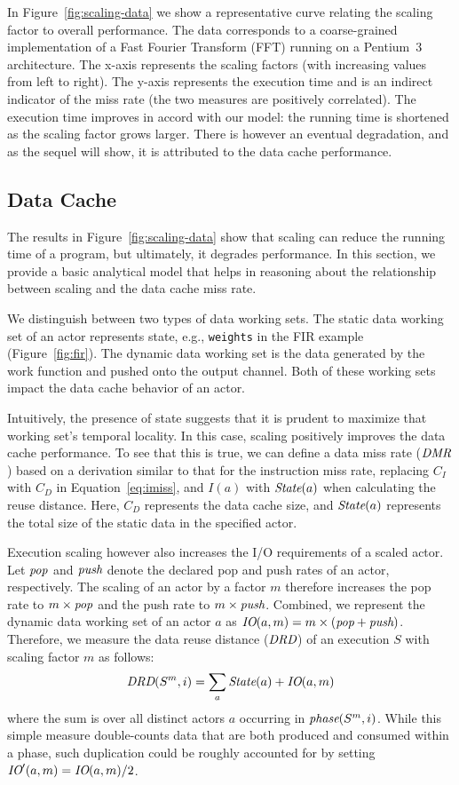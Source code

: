 \documentclass{sigplanconf}
\newcommand{\mt}[1]{\mbox{\it #1}}
\begin{document}
In Figure~\ref{fig:scaling-data} we show a
representative curve relating the scaling factor to overall
performance. The data corresponds to a coarse-grained implementation of 
a Fast Fourier Transform (FFT) running on a Pentium~3 architecture. The
x-axis represents the scaling factors (with increasing values from
left to right). The y-axis represents the execution time and is an
indirect indicator of the miss rate (the two measures are positively
correlated). The execution time improves in accord with our model: 
the running time is shortened as the scaling factor grows larger. There
is however an eventual degradation, and as the sequel will show, it is 
attributed to the data cache performance.

\subsection{Data Cache}

The results in Figure~\ref{fig:scaling-data} show that scaling can
reduce the running time of a program, but ultimately, it degrades
performance. In this section, we provide a basic analytical model that
helps in reasoning about the relationship between scaling and the data
cache miss rate. 

We distinguish between two types of data working sets. The static data
working set of an actor represents state, e.g., \texttt{weights} in
the FIR example (Figure~\ref{fig:fir}).  The dynamic data
working set is the data generated by the work function and pushed onto
the output channel. Both of these working sets impact the data cache
behavior of an actor.

Intuitively, the presence of state suggests that it is
prudent to maximize that working set's temporal locality. In this
case, scaling positively improves the data cache performance. To see
that this is true, we can define a data miss rate ($\mt{DMR}$) based on
a derivation similar to that for the instruction miss rate, replacing
$C_I$ with $C_D$ in Equation~\ref{eq:imiss}, and $I(a)$ with
$\mt{State}(a)$ when calculating the reuse distance. Here, $C_D$
represents the data cache size, and
$\mt{State}(a)$ represents the total size of the static data in the
specified actor. 

Execution scaling however also increases the I/O requirements of a
scaled actor. Let $\mt{pop}$ and $\mt{push}$ denote the declared pop and push rates
of an actor, respectively.  The scaling of an
actor by a factor $m$ therefore increases the pop rate to $m\times \mt{pop}$
and the push rate to $m\times \mt{push}$. Combined, we represent the dynamic
data working set of an actor $a$ as $\mt{IO}(a, m) =
m\times(\mt{pop}+\mt{push})$. Therefore, we measure the data reuse distance ($\mt{DRD}$)
of an execution $S$ with scaling factor $m$ as follows:
\[
  \mt{DRD}(S^m,i)=\sum_{a} \mt{State}(a) + \mt{IO}(a,m)
\]
where the sum is over all distinct actors $a$ occurring in $\mt{phase}(S^m,i)$.  While
this simple measure double-counts data that are both produced and
consumed within a phase, such duplication could be roughly accounted
for by setting $\mt{IO}'(a,m) = \mt{IO}(a,m) / 2$.
\end{document}
